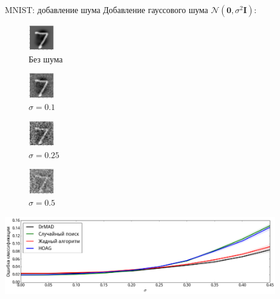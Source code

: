 \documentclass[11pt,pdf,utf8,russian,aspectratio=169]{beamer}
\begin{document}
\begin{frame}{MNIST: добавление шума}
Добавление гауссового шума $\mathcal{N}(\mathbf{0},\sigma^2\mathbf{I})$:
\setlength{\columnsep}{10pt}
\begin{multicols}{4}
\begin{figure}[h]
\includegraphics[width=0.10\textwidth]{./slide_plots/mnist0.png}
\caption*{Без шума}
\end{figure}

\begin{figure}[h]
\includegraphics[width=0.10\textwidth]{./slide_plots/mnist10.png}
\caption*{$\sigma=0.1$}
\end{figure}

\begin{figure}[h]
\includegraphics[width=0.10\textwidth]{./slide_plots/mnist25.png}
\caption*{$\sigma=0.25$}
\end{figure}

\begin{figure}[h]
\includegraphics[width=0.10\textwidth]{./slide_plots/mnist50.png}
\caption*{$\sigma=0.5$}
\end{figure}
\end{multicols}
\begin{center}
\includegraphics[width=0.9\textwidth]{./slide_plots/noise.png}
\end{center}
\end{frame}
\end{document}
